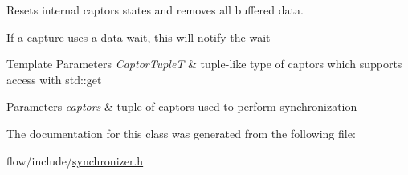 Resets internal captors states and removes all buffered data. 

If a capture uses a data wait, this will notify the wait


\begin{DoxyTemplParams}{Template Parameters}
{\em Captor\+TupleT} & tuple-\/like type of captors which supports access with {\ttfamily std\+::get}\\
\hline
\end{DoxyTemplParams}

\begin{DoxyParams}{Parameters}
{\em captors} & tuple of captors used to perform synchronization \\
\hline
\end{DoxyParams}


The documentation for this class was generated from the following file\+:\begin{DoxyCompactItemize}
\item 
flow/include/\hyperlink{synchronizer_8h}{synchronizer.\+h}\end{DoxyCompactItemize}

